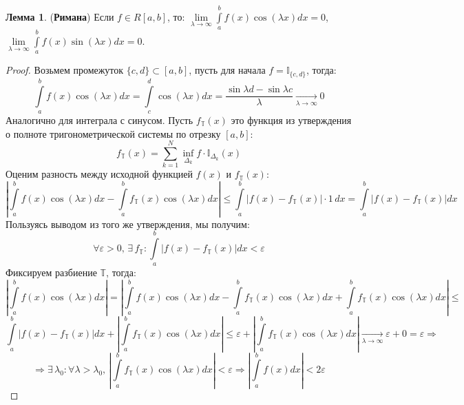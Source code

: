 \documentclass[12pt]{article}
\newcommand{\MTB}{\mathbb{T}}
\newcommand{\MTI}{\mathbb{I}}
\newcommand{\VE}{\varepsilon}
\theoremstyle{definition}
\newtheorem{lemma}{Лемма}
\newcommand{\ddsum}[2]{\displaystyle\sum\limits_{#1}^{#2}}
\newcommand{\ddint}[2]{\displaystyle\int\limits_{#1}^{#2}}
\begin{document}
\begin{lemma}(\textbf{Римана})
	Если $f \in R[a,b]$, то: $\lim\limits_{\lambda \to \infty}\ddint{a}{b}f(x)\cos{(\lambda x)}dx =0$, $\lim\limits_{\lambda \to \infty}\ddint{a}{b}f(x)\sin{(\lambda x)}dx =0$.
\end{lemma}
\begin{proof}
	Возьмем промежуток $\{c,d\} \subset [a,b]$, пусть для начала $f = \MTI_{\{c,d\}}$, тогда:
	$$
		\ddint{a}{b}f(x)\cos{(\lambda x)}dx = \ddint{c}{d}\cos{(\lambda x)}dx = \dfrac{\sin{\lambda d} - \sin{\lambda c}}{\lambda} \xrightarrow[\lambda \to \infty]{} 0
	$$
	Аналогично для интеграла с синусом. Пусть $f_{\MTB}(x)$ это функция из утверждения о полноте тригонометрической системы по отрезку $[a,b]$:
	$$
		f_{\MTB}(x) = \ddsum{k = 1}{N}\inf\limits_{\Delta_k}f{\cdot}\MTI_{\Delta_k}(x)
	$$
	Оценим разность между исходной функцией $f(x)$ и $f_{\MTB}(x)$:
	$$
		\left|\ddint{a}{b}f(x)\cos{(\lambda x)}dx - \ddint{a}{b}f_{\MTB}(x)\cos{(\lambda x)}dx \right| \leq \ddint{a}{b}|f(x) - f_{\MTB}(x)|{\cdot}1 \, dx =  \ddint{a}{b}|f(x) - f_{\MTB}(x)| dx
	$$
	Пользуясь выводом из того же утверждения, мы получим:
	$$
		\forall \VE > 0, \, \exists \, f_{\MTB} \colon \ddint{a}{b}|f(x) - f_{\MTB}(x)| dx < \VE
	$$
	Фиксируем разбиение $\MTB$, тогда:
	$$
		\left|\ddint{a}{b}f(x)\cos{(\lambda x)}dx \right| =  
		\left|\ddint{a}{b}f(x)\cos{(\lambda x)}dx - \ddint{a}{b}f_{\MTB}(x)\cos{(\lambda x)}dx + \ddint{a}{b}f_{\MTB}(x)\cos{(\lambda x)}dx \right| \leq 
	$$
	$$	
		\ddint{a}{b}|f(x) - f_{\MTB}(x)| dx + \left|\ddint{a}{b}f_{\MTB}(x)\cos{(\lambda x)}dx \right|	
		\leq \VE + \left|\ddint{a}{b}f_{\MTB}(x)\cos{(\lambda x)}dx \right| \xrightarrow[\lambda \to \infty]{} \VE + 0 = \VE \Rightarrow
	$$
	$$
		\Rightarrow \exists \, \lambda_0 \colon \forall \lambda > \lambda_0, \, \left|\ddint{a}{b}f_{\MTB}(x)\cos{(\lambda x)}dx \right| < \VE \Rightarrow 	\left|\ddint{a}{b}f(x)dx \right| < 2\VE
	$$
	
\end{proof}
\end{document}
